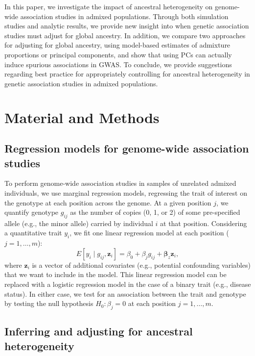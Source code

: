 \documentclass[12pt]{article}
\begin{document}
In this paper, we investigate the impact of ancestral heterogeneity on genome-wide association studies in admixed populations.
Through both simulation studies and analytic results, we provide new insight into when genetic association studies must adjust for global ancestry.
In addition, we compare two approaches for adjusting for global ancestry, using model-based estimates of admixture proportions or principal components, and show that using PCs can actually induce spurious associations in GWAS.
To conclude, we provide suggestions regarding best practice for appropriately controlling for ancestral heterogeneity in genetic association studies in admixed populations.



\section{Material and Methods}


\subsection{Regression models for genome-wide association studies}

To perform genome-wide association studies in samples of unrelated admixed individuals, we use marginal regression models, regressing the trait of interest on the genotype at each position across the genome. 
At a given position $j$, we quantify genotype $g_{ij}$ as the number of copies (0, 1, or 2) of some pre-specified allele (e.g., the minor allele) carried by individual $i$ at that position. 
Considering a quantitative trait $y_i$, we fit one linear regression model at each position ($j = 1, \dots, m$): $$E[y_i \mid g_{ij}, \mathbf{z}_i] = \beta_0 + \beta_j g_{ij} + \boldsymbol{\beta}_z \mathbf{z}_i,$$ where $\mathbf{z}_i$ is a vector of additional covariates (e.g., potential confounding variables) that we want to include in the model.
This linear regression model can be replaced with a logistic regression model in the case of a binary trait (e.g., disease status).
In either case, we test for an association between the trait and genotype by testing the null hypothesis $H_0: \beta_j = 0$ at each position $j = 1, \dots, m$.


\subsection{Inferring and adjusting for ancestral heterogeneity}
\end{document}
